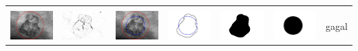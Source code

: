 \begin{table}[H]
\begin{tabular}{|m{0.7in}|m{0.7in}|m{0.7in}|m{0.7in}|m{0.7in}|m{0.7in}|m{0.7in}|}
		&  &  & & & &  \\
		\includegraphics[width=0.7in]{dataset/dataset_3/luka_kuning/ready/23_integer_init.jpg}&
		\includegraphics[width=0.7in]{dataset/dataset_3/luka_kuning/ready/23_integer_ext.jpg}&
		\includegraphics[width=0.7in]{dataset/dataset_3/luka_kuning/ready/23_integer_result.jpg}&
		\includegraphics[width=0.7in]{dataset/dataset_3/luka_kuning/ready/23_gt_r_integer.jpg}&
		\includegraphics[width=0.7in]{dataset/dataset_3/luka_kuning/ready/23_r.jpg}&
		\includegraphics[width=0.7in]{dataset/dataset_3/luka_kuning/ready/23_integer_r.jpg}&
		gagal\\
		\hline
		

\end{tabular}
\end{table}

